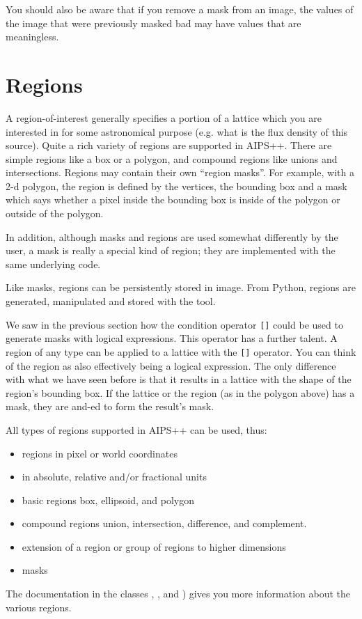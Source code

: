 \medskip\noindent You should also be aware that if you remove a mask from an image,
the values of the image that were previously masked bad 
may have values that are meaningless.


\section{\label{LEL:REGIONS}Regions}

A region-of-interest generally specifies a portion of a lattice which you
are interested in for some astronomical purpose (e.g.  what is the flux
density of this source).  Quite a rich variety of regions are supported
in AIPS++.  There are simple regions like a box or a polygon, and
compound regions like unions and intersections.  Regions may contain
their own ``region masks''.  For example, with a 2-d polygon, the region is defined
by the vertices, the bounding box and a mask which says whether a pixel
inside the bounding box is inside of the polygon or outside of the
polygon. 

\medskip\noindent In addition, although masks and regions are used somewhat differently by
the user, a mask is really a special kind of region; they are implemented
with the same underlying code.

\medskip\noindent Like masks, regions can be persistently stored in image.  From Python,
regions are generated, manipulated and stored with the
 tool.

\medskip\noindent We saw in the previous section how the condition operator {\tt []} could
be used to generate masks with logical expressions.  This operator has a
further talent.  A region of any type can be applied to a lattice with
the {\tt []} operator.  You can think of the region as also effectively
being a logical expression.  The only difference with what we have seen
before is that it results in a lattice with the shape of the region's
bounding box.  If the lattice or the region (as in the polygon above)
has a mask, they are and-ed to form the result's mask. 

\medskip\noindent All types of regions supported in AIPS++ can be used, thus:

\begin{itemize}
\item regions in pixel or world coordinates
\item in absolute, relative and/or fractional units
\item basic regions box, ellipsoid, and polygon
\item compound regions union, intersection, difference, and complement.
\item extension of a region or group of regions to higher dimensions
\item masks
\end{itemize}
The documentation in the classes
 ,
 , and
 )
gives you more information about the various regions.

